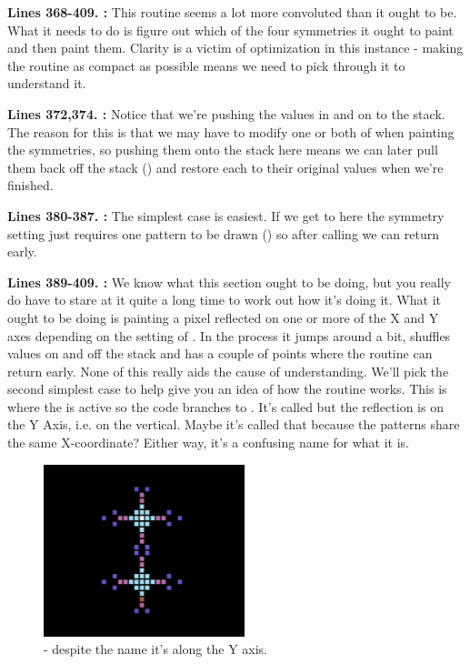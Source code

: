 \textbf{Lines 368-409. :} This routine seems a lot more convoluted than it
ought to be. What it needs to do is figure out which of the four symmetries it ought to paint and then paint them. Clarity
is a victim of optimization in this instance - making the routine as compact as possible means we need to pick through it
to understand it.

\textbf{Lines 372,374. :} Notice that we're pushing the values in  and 
on to the stack. The reason for this is that we may have to modify one or both of  when
painting the symmetries, so pushing them onto the stack here means we can later pull them back off the stack () and restore each to their original
values when we're finished.

\textbf{Lines 380-387. :} The simplest case is easiest. If we get to here
the symmetry setting just requires one pattern to be drawn () so after calling 
we can return early.

\textbf{Lines 389-409. :} We know what this section ought to be doing, but you really do have
to stare at it quite a long time to work out how it's doing it. What it ought to be doing is painting a pixel reflected on one or more
of the X and Y axes depending on the setting of . In the process it jumps around a bit,
shuffles values on and off the stack and has a couple of points where the routine can return early. None of this really aids
the cause of understanding. We'll pick the second simplest case to help give you an idea of how the routine works. This is where
the  is active so the code branches to .
It's called  but the reflection is on the Y Axis, i.e.
on the vertical. Maybe it's called that because the patterns share the same X-coordinate? Either way, it's a confusing name for what
it is.

\begin{figure}[H]
    \centering
      \includegraphics[height=5cm]{src/symmetries/xaxis.png}
  \caption*{ - despite the name it's along the Y axis.}
\end{figure}

